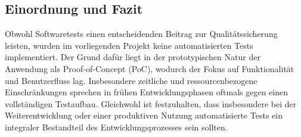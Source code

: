 \subsection{Einordnung und Fazit}

Obwohl Softwaretests einen entscheidenden Beitrag zur Qualitätssicherung leisten, wurden im vorliegenden Projekt keine automatisierten Tests implementiert. Der Grund dafür liegt in der prototypischen Natur der Anwendung als Proof-of-Concept (PoC), wodurch der Fokus auf Funktionalität und Benutzerfluss lag. Insbesondere zeitliche und ressourcenbezogene Einschränkungen sprechen in frühen Entwicklungsphasen oftmals gegen einen vollständigen Testaufbau. Gleichwohl ist festzuhalten, dass insbesondere bei der Weiterentwicklung oder einer produktiven Nutzung automatisierte Tests ein integraler Bestandteil des Entwicklungsprozesses sein sollten.